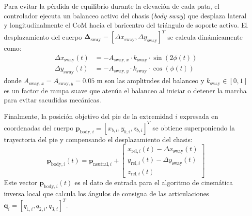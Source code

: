 Para evitar la pérdida de equilibrio durante la elevación de cada pata, el controlador ejecuta un balanceo activo del chasis (\textit{body sway}) que desplaza lateral y longitudinalmente el CoM hacia el baricentro del triángulo de soporte activo. El desplazamiento del cuerpo $\boldsymbol{\Delta}_{\text{sway}} = [\Delta x_{\text{sway}}, \Delta y_{\text{sway}}]^T$ se calcula dinámicamente como:
\begin{align}
    \Delta x_{\text{sway}}(t) &= -A_{\text{sway}, x} \cdot k_{\text{sway}} \cdot \sin(2\phi(t)) \\
    \Delta y_{\text{sway}}(t) &= -A_{\text{sway}, y} \cdot k_{\text{sway}} \cdot \cos(\phi(t))
\end{align}
donde $A_{\text{sway}, x} = A_{\text{sway}, y} = 0.05\text{ m}$ son las amplitudes del balanceo y $k_{\text{sway}} \in [0, 1]$ es un factor de rampa suave que atenúa el balanceo al iniciar o detener la marcha para evitar sacudidas mecánicas. 

Finalmente, la posición objetivo del pie de la extremidad $i$ expresada en coordenadas del cuerpo $\mathbf{p}_{\text{body}, i} = [x_{b,i}, y_{b,i}, z_{b,i}]^T$ se obtiene superponiendo la trayectoria del pie y compensando el desplazamiento del chasis:
\begin{equation}
    \mathbf{p}_{\text{body}, i}(t) = \mathbf{p}_{\text{neutral}, i} + \begin{bmatrix}
        x_{\text{rel}, i}(t) - \Delta x_{\text{sway}}(t) \\
        y_{\text{rel}, i}(t) - \Delta y_{\text{sway}}(t) \\
        z_{\text{rel}, i}(t)
    \end{bmatrix}
\end{equation}
Este vector $\mathbf{p}_{\text{body}, i}(t)$ es el dato de entrada para el algoritmo de cinemática inversa local que calcula los ángulos de consigna de las articulaciones $\mathbf{q}_i = [q_{1,i}, q_{2,i}, q_{3,i}]^T$.

